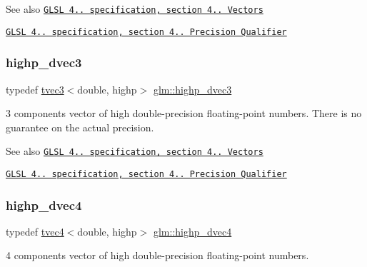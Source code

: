 \begin{DoxySeeAlso}{See also}
\href{http://www.opengl.org/registry/doc/GLSLangSpec.4.20.8.pdf}{\tt G\+L\+SL 4.. specification, section 4.. Vectors} 

\href{http://www.opengl.org/registry/doc/GLSLangSpec.4.20.8.pdf}{\tt G\+L\+SL 4.. specification, section 4.. Precision Qualifier} 
\end{DoxySeeAlso}
\mbox{\label{group__core__precision_ga54e097f7cd1f1cd46cc47eec67218bd3}} 
\subsubsection{\texorpdfstring{highp\+\_\+dvec3}{highp\_dvec3}}
{\footnotesize\ttfamily typedef \hyperlink{structglm_1_1tvec3}{tvec3}$<$double, highp$>$ \hyperlink{group__core__precision_ga54e097f7cd1f1cd46cc47eec67218bd3}{glm\+::highp\+\_\+dvec3}}

3 components vector of high double-\/precision floating-\/point numbers. There is no guarantee on the actual precision.

\begin{DoxySeeAlso}{See also}
\href{http://www.opengl.org/registry/doc/GLSLangSpec.4.20.8.pdf}{\tt G\+L\+SL 4.. specification, section 4.. Vectors} 

\href{http://www.opengl.org/registry/doc/GLSLangSpec.4.20.8.pdf}{\tt G\+L\+SL 4.. specification, section 4.. Precision Qualifier} 
\end{DoxySeeAlso}
\mbox{\label{group__core__precision_ga2bb20b4bd180746b93577bc57f4b2b9d}} 
\subsubsection{\texorpdfstring{highp\+\_\+dvec4}{highp\_dvec4}}
{\footnotesize\ttfamily typedef \hyperlink{structglm_1_1tvec4}{tvec4}$<$double, highp$>$ \hyperlink{group__core__precision_ga2bb20b4bd180746b93577bc57f4b2b9d}{glm\+::highp\+\_\+dvec4}}

4 components vector of high double-\/precision floating-\/point numbers.


